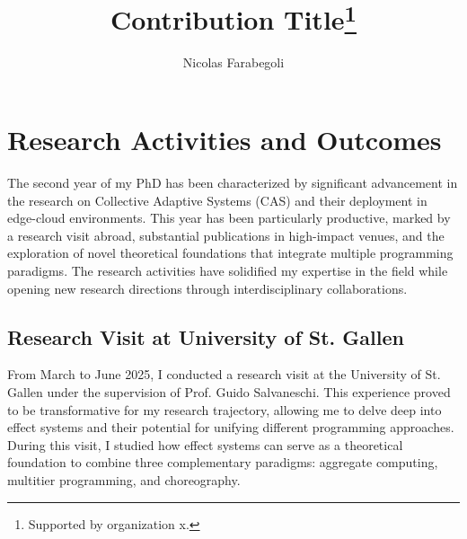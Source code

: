 \documentclass[runningheads]{llncs}
\begin{document}
%
\title{Contribution Title\thanks{Supported by organization x.}}
%
%
\author{Nicolas Farabegoli}
%
%
%
\maketitle              %
%

%
%
%
\section{Research Activities and Outcomes}

The second year of my PhD has been characterized by significant advancement in the research on Collective Adaptive Systems (CAS) and their deployment in edge-cloud environments. This year has been particularly productive, marked by a research visit abroad, substantial publications in high-impact venues, and the exploration of novel theoretical foundations that integrate multiple programming paradigms. The research activities have solidified my expertise in the field while opening new research directions through interdisciplinary collaborations.

\subsection{Research Visit at University of St. Gallen}

From March to June 2025, I conducted a research visit at the University of St. Gallen under the supervision of Prof. Guido Salvaneschi. This experience proved to be transformative for my research trajectory, allowing me to delve deep into effect systems and their potential for unifying different programming approaches. During this visit, I studied how effect systems can serve as a theoretical foundation to combine three complementary paradigms: aggregate computing, multitier programming, and choreography.
\end{document}
